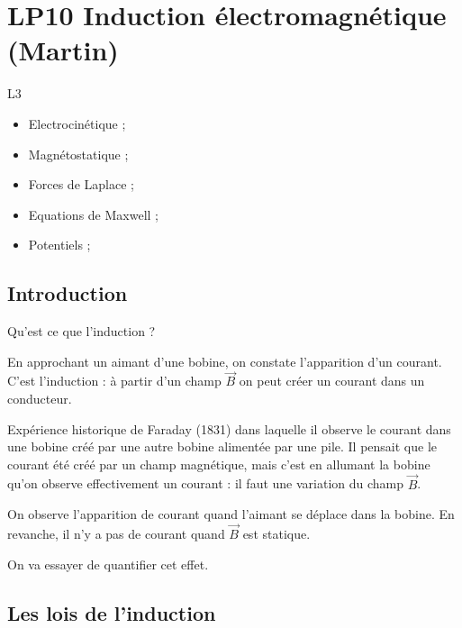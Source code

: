 \section{LP10 Induction électromagnétique (Martin)}

\niveau L3

\prerequis
\begin{itemize}
\item Electrocinétique ;
\item Magnétostatique ;
\item Forces de Laplace ;
\item Equations de Maxwell ;
\item Potentiels ;
\end{itemize}

\footnotesize{}

\subsection{Introduction}

Qu'est ce que l'induction ?

\begin{experience}
En approchant un aimant d'une bobine, on constate l'apparition d'un courant.
C'est l'induction : à partir d'un champ $\overrightarrow{B}$ on peut créer un courant dans un conducteur.
\end{experience}

\begin{slide}
Expérience historique de Faraday (1831) dans laquelle il observe le courant dans une bobine créé par une autre bobine alimentée par une pile.
Il pensait que le courant été créé par un champ magnétique, mais c'est en allumant la bobine qu'on observe effectivement un courant : il faut une variation du champ $\overrightarrow{B}$.
\end{slide}

\begin{experience}
On observe l'apparition de courant quand l'aimant se déplace dans la bobine. En revanche, il n'y a pas de courant quand $\overrightarrow{B}$ est statique.
\end{experience}

\begin{transition}
On va essayer de quantifier cet effet.
\end{transition}

\subsection{Les lois de l'induction}

